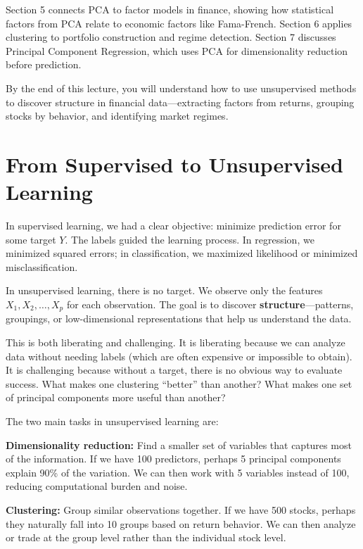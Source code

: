 \documentclass[11pt,a4paper]{article}
\newcommand{\keyword}[1]{\textbf{\textcolor{AccentOrange}{#1}}}
\begin{document}
Section 5 connects PCA to factor models in finance, showing how statistical factors from PCA relate to economic factors like Fama-French. Section 6 applies clustering to portfolio construction and regime detection. Section 7 discusses Principal Component Regression, which uses PCA for dimensionality reduction before prediction.

By the end of this lecture, you will understand how to use unsupervised methods to discover structure in financial data---extracting factors from returns, grouping stocks by behavior, and identifying market regimes.

\section{From Supervised to Unsupervised Learning}

In supervised learning, we had a clear objective: minimize prediction error for some target $Y$. The labels guided the learning process. In regression, we minimized squared errors; in classification, we maximized likelihood or minimized misclassification.

In unsupervised learning, there is no target. We observe only the features $X_1, X_2, \ldots, X_p$ for each observation. The goal is to discover \keyword{structure}---patterns, groupings, or low-dimensional representations that help us understand the data.

This is both liberating and challenging. It is liberating because we can analyze data without needing labels (which are often expensive or impossible to obtain). It is challenging because without a target, there is no obvious way to evaluate success. What makes one clustering ``better'' than another? What makes one set of principal components more useful than another?

The two main tasks in unsupervised learning are:

\textbf{Dimensionality reduction:} Find a smaller set of variables that captures most of the information. If we have 100 predictors, perhaps 5 principal components explain 90\% of the variation. We can then work with 5 variables instead of 100, reducing computational burden and noise.

\textbf{Clustering:} Group similar observations together. If we have 500 stocks, perhaps they naturally fall into 10 groups based on return behavior. We can then analyze or trade at the group level rather than the individual stock level.
\end{document}
